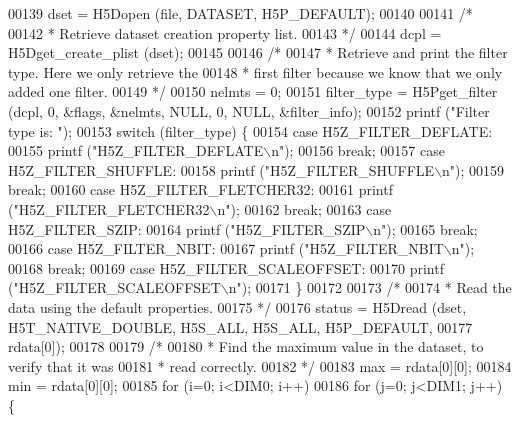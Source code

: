 \begin{DoxyCode}
{{00139     dset = H5Dopen (file, DATASET, H5P\_DEFAULT);
00140 
00141     \textcolor{comment}{/*}
00142 \textcolor{comment}{     * Retrieve dataset creation property list.}
00143 \textcolor{comment}{     */}
00144     dcpl = H5Dget\_create\_plist (dset);
00145 
00146     \textcolor{comment}{/*}
00147 \textcolor{comment}{     * Retrieve and print the filter type.  Here we only retrieve the}
00148 \textcolor{comment}{     * first filter because we know that we only added one filter.}
00149 \textcolor{comment}{     */}
00150     nelmts = 0;
00151     filter\_type = H5Pget\_filter (dcpl, 0, &flags, &nelmts, NULL, 0, NULL, &filter\_info);
00152     printf (\textcolor{stringliteral}{"Filter type is: "});
00153     \textcolor{keywordflow}{switch} (filter\_type) \{
00154         \textcolor{keywordflow}{case} H5Z\_FILTER\_DEFLATE:
00155             printf (\textcolor{stringliteral}{"H5Z\_FILTER\_DEFLATE\(\backslash\)n"});
00156             \textcolor{keywordflow}{break};
00157         \textcolor{keywordflow}{case} H5Z\_FILTER\_SHUFFLE:
00158             printf (\textcolor{stringliteral}{"H5Z\_FILTER\_SHUFFLE\(\backslash\)n"});
00159             \textcolor{keywordflow}{break};
00160         \textcolor{keywordflow}{case} H5Z\_FILTER\_FLETCHER32:
00161             printf (\textcolor{stringliteral}{"H5Z\_FILTER\_FLETCHER32\(\backslash\)n"});
00162             \textcolor{keywordflow}{break};
00163         \textcolor{keywordflow}{case} H5Z\_FILTER\_SZIP:
00164             printf (\textcolor{stringliteral}{"H5Z\_FILTER\_SZIP\(\backslash\)n"});
00165             \textcolor{keywordflow}{break};
00166         \textcolor{keywordflow}{case} H5Z\_FILTER\_NBIT:
00167             printf (\textcolor{stringliteral}{"H5Z\_FILTER\_NBIT\(\backslash\)n"});
00168             \textcolor{keywordflow}{break};
00169         \textcolor{keywordflow}{case} H5Z\_FILTER\_SCALEOFFSET:
00170             printf (\textcolor{stringliteral}{"H5Z\_FILTER\_SCALEOFFSET\(\backslash\)n"});
00171     \}
00172 
00173     \textcolor{comment}{/*}
00174 \textcolor{comment}{     * Read the data using the default properties.}
00175 \textcolor{comment}{     */}
00176     status = H5Dread (dset, H5T\_NATIVE\_DOUBLE, H5S\_ALL, H5S\_ALL, H5P\_DEFAULT,
00177                 rdata[0]);
00178 
00179     \textcolor{comment}{/*}
00180 \textcolor{comment}{     * Find the maximum value in the dataset, to verify that it was}
00181 \textcolor{comment}{     * read correctly.}
00182 \textcolor{comment}{     */}
00183     max = rdata[0][0];
00184     min = rdata[0][0];
00185     \textcolor{keywordflow}{for} (i=0; i<DIM0; i++)
00186         \textcolor{keywordflow}{for} (j=0; j<DIM1; j++) \{
}}
\end{DoxyCode}
